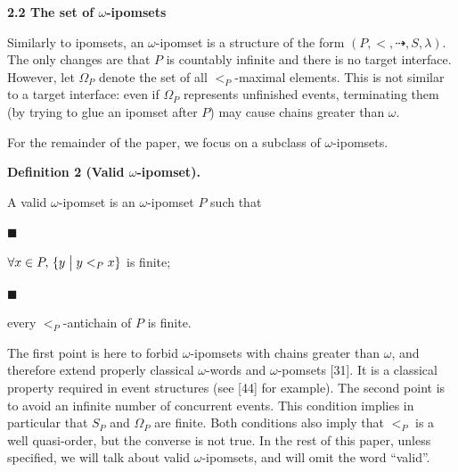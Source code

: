  
\par\medskip\noindent\textbf{2.2 The set of $\omega$-ipomsets}\par
 
 
Similarly to ipomsets, an $\omega$-ipomset is a structure of the form $(P,{<},{\dashrightarrow},S,\lambda)$. The only changes are that $P$ is countably infinite and there is no target interface. However, let $\Omega_{P}$ denote the set of all $<_{P}$-maximal elements. This is not similar to a target interface: even if $\Omega_{P}$ represents unfinished events, terminating them (by trying to glue an ipomset after $P$) may cause chains greater than $\omega$.\par
 
 
 
For the remainder of the paper, we focus on a subclass of $\omega$-ipomsets.\par
 
 
 
\par\medskip\noindent\textbf{Definition 2 (Valid $\omega$-ipomset).}\par
 
 
A valid $\omega$-ipomset is an $\omega$-ipomset $P$ such that\par
  
\par\noindent  $\blacksquare$ 
 
$\forall x\in P,\,{\{y\mathrel{\big{|}}y<_{P}x\}}$ is finite;\par
 
 
 
\par\noindent  $\blacksquare$ 
 
every $<_{P}$-antichain of $P$ is finite.\par
 
 
  
 
 
 
The first point is here to forbid $\omega$-ipomsets with chains greater than $\omega$, and therefore extend properly classical $\omega$-words and $\omega$-pomsets [31]. It is a classical property required in event structures (see [44] for example). The second point is to avoid an infinite number of concurrent events. This condition implies in particular that $S_{P}$ and $\Omega_{P}$ are finite. Both conditions also imply that $<_{P}$ is a well quasi-order, but the converse is not true. In the rest of this paper, unless specified, we will talk about valid $\omega$-ipomsets, and will omit the word “valid”.\par
 
